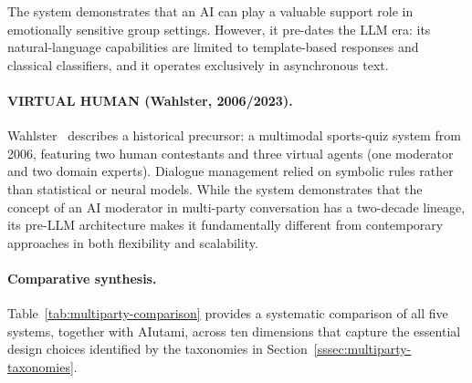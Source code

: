 The system demonstrates that an AI can play a valuable support role in
emotionally sensitive group settings.  However, it pre-dates the LLM era: its
natural-language capabilities are limited to template-based responses and
classical classifiers, and it operates exclusively in asynchronous text.

\paragraph{VIRTUAL HUMAN (Wahlster, 2006/2023).}
Wahlster~\cite{wahlster2023virtual} describes a historical precursor: a
multimodal sports-quiz system from 2006, featuring two human contestants and
three virtual agents (one moderator and two domain experts).  Dialogue
management relied on symbolic rules rather than statistical or neural models.
While the system demonstrates that the concept of an AI moderator in multi-party
conversation has a two-decade lineage, its pre-LLM architecture makes it
fundamentally different from contemporary approaches in both flexibility and
scalability.

\paragraph{Comparative synthesis.}
Table~\ref{tab:multiparty-comparison} provides a systematic comparison of all
five systems, together with AIutami, across ten dimensions that capture the
essential design choices identified by the taxonomies in
Section~\ref{sssec:multiparty-taxonomies}.

